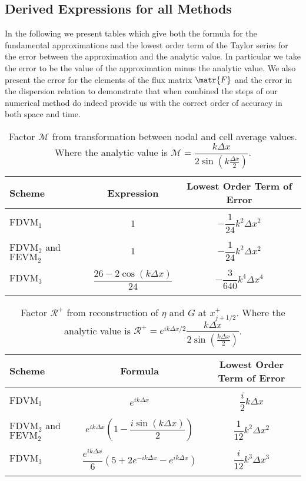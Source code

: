\subsection{Derived Expressions for all Methods}
\label{subsec:TabFacdisp}
In the following we present tables which give both the formula for the fundamental approximations and the lowest order term of the Taylor series for the error between the approximation and the analytic value. In particular we take the error to be the value of the approximation minus the analytic value. We also present the error for the elements of the flux matrix $\matr{F}$ and the error in the dispersion relation to demonstrate that when combined the steps of our numerical method do indeed provide us with the correct order of accuracy in both space and time. 
\begin{table}
	\centering
	\begin{tabular}{l  c  c}
		Scheme& Expression& Lowest Order Term of Error \\
		\hline && \\
		$\text{FDVM}_1$ & $1$ & $-\dfrac{1}{24}k^2 \Delta x^2$ \\ & & \\
		$\text{FDVM}_2$ and $\text{FEVM}_2$& $1$ & $-\dfrac{1}{24}k^2 \Delta x^2$ \\ & & \\
		$\text{FDVM}_3$& $\dfrac{26 - 2 \cos\left(k \Delta x\right)}{24}$ & $-\dfrac{3}{640}k^4 \Delta x^4$ \\ & & \\
	\end{tabular}
	\caption{Factor $\mathcal{M}$ from transformation between nodal and cell average values. Where the analytic value is $\mathcal{M} = \dfrac{k\Delta x}{2 \sin \left(k\frac{\Delta x}{2}\right)  }$.}
	\label{tab:Mfactor}
\end{table}
%
\begin{table}
\centering
	\begin{tabular}{l  c  c}
		Scheme& Formula& Lowest Order Term of Error\\
		\hline && \\
		$\text{FDVM}_1$ & $e^{i k {\Delta x}}$ & $\dfrac{i}{2}k \Delta x$ \\ & & \\
		$\text{FDVM}_2$ and $\text{FEVM}_2$& $e^{i k {\Delta x}} \left(1 - \dfrac{i \sin\left(k\Delta x \right)}{2} \right)$ & $\dfrac{1}{12}k^2 \Delta x^2$ \\ & & \\
		$\text{FDVM}_3$& $\dfrac{e^{i k {\Delta x}}}{6}\left({5 + 2e^{-i k {\Delta x}} - e^{i k {\Delta x}}} \right)$ & $\dfrac{i}{12}k^3 \Delta x^3$ \\ & & \\
	\end{tabular}
	\caption{Factor $\mathcal{R}^+$ from reconstruction of $\eta$ and $G$ at $x^+_{j+1/2}$. Where the analytic value is $\mathcal{R}^+ =e^{i k \Delta x/2} \dfrac{k\Delta x}{2 \sin\left(\frac{k \Delta x}{2}\right)}$. }
	\label{tab:Rpfactor}
\end{table}
